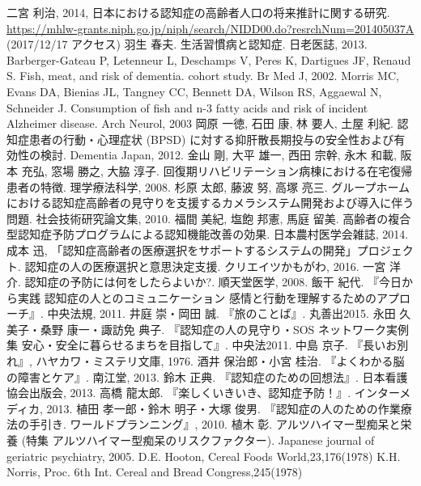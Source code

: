 \documentclass[openany,11pt,papersize]{jsbook}
\begin{document}

\begin{thebibliography}{9}
     二宮 利治, 2014, 日本における認知症の高齢者人口の将来推計に関する研究. \\ \url{https://mhlw-grants.niph.go.jp/niph/search/NIDD00.do?resrchNum=201405037A} (2017/12/17 アクセス)
     羽生 春夫. 生活習慣病と認知症. 日老医誌, 2013.
     Barberger-Gateau P, Letenneur L, Deschamps V, Peres K, Dartigues JF, Renaud S. Fish, meat, and risk of dementia. cohort study. Br Med J, 2002.
     Morris MC, Evans DA, Bienias JL, Tangney  CC, Bennett DA, Wilson RS, Aggaewal N, Schneider J. Consumption of fish and n-3 fatty acids and risk of incident Alzheimer disease. Arch Neurol, 2003
     岡原 一徳, 石田 康, 林 要人, 土屋 利紀. 認知症患者の行動・心理症状 (BPSD) に対する抑肝散長期投与の安全性および有効性の検討. Dementia Japan, 2012.
     金山 剛, 大平 雄一, 西田 宗幹, 永木 和載, 阪本 充弘, 窓場 勝之, 大脇 淳子. 回復期リハビリテーション病棟における在宅復帰患者の特徴. 理学療法科学, 2008.
     杉原 太郎, 藤波 努, 高塚 亮三. グループホームにおける認知症高齢者の見守りを支援するカメラシステム開発および導入に伴う問題. 社会技術研究論文集, 2010.
     福間 美紀, 塩飽 邦憲, 馬庭 留美. 高齢者の複合型認知症予防プログラムによる認知機能改善の効果. 日本農村医学会雑誌, 2014.
     成本 迅, 「認知症高齢者の医療選択をサポートするシステムの開発」プロジェクト. 認知症の人の医療選択と意思決定支援. クリエイツかもがわ, 2016.
     一宮 洋介. 認知症の予防には何をしたらよいか?. 順天堂医学, 2008.
     飯干 紀代. 『今日から実践 認知症の人とのコミュニケーション 感情と行動を理解するためのアプローチ』. 中央法規, 2011.
    \bibitem{} 井庭 崇・岡田 誠. 『旅のことば』. 丸善出2015.
    \bibitem{} 永田 久美子・桑野 康一・諏訪免 典子. 『認知症の人の見守り・SOS ネットワーク実例集 安心・安全に暮らせるまちを目指して』. 中央法2011.
    \bibitem{} 中島 京子. 『長いお別れ』, ハヤカワ・ミステリ文庫, 1976.
    \bibitem{} 酒井 保治郎・小宮 桂治. 『よくわかる脳の障害とケア』. 南江堂, 2013.
    \bibitem{} 鈴木 正典. 『認知症のための回想法』. 日本看護協会出版会, 2013.
    \bibitem{} 高橋 龍太郎. 『楽しくいきいき、認知症予防！』. インターメディカ, 2013.
     植田 孝一郎・鈴木 明子・大塚 俊男. 『認知症の人のための作業療法の手引き. ワールドプランニング』, 2010.
     植木 彰. アルツハイマー型痴呆と栄養 (特集 アルツハイマー型痴呆のリスクファクター). Japanese journal of geriatric psychiatry, 2005.
     D.E. Hooton, Cereal Foods World,23,176(1978)
     K.H. Norris, Proc. 6th Int. Cereal and Bread Congress,245(1978)
\end{thebibliography}
\end{document}
